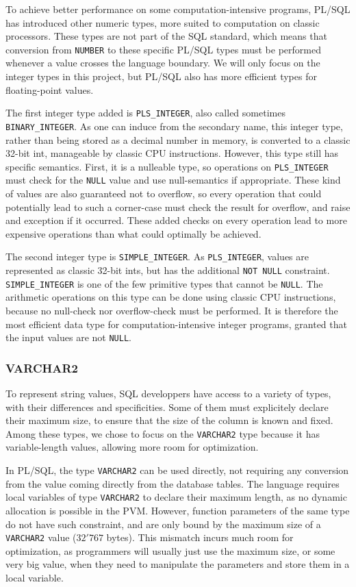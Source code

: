 \documentclass[twoside,11pt,a4paper]{article}
\newcommand{\pls}[1]{\texttt{#1}}
\newcommand{\plstype}[1]{\pls{#1}}
\newcommand{\varchar}{\plstype{VARCHAR2}}
\newcommand{\oranum}{\plstype{NUMBER}}
\newcommand{\plsi}{\plstype{PLS\_INTEGER}}
\newcommand{\simpleint}{\plstype{SIMPLE\_INTEGER}}
\newcommand{\plsnull}{\pls{NULL}}
\begin{document}
To achieve better performance on some computation-intensive programs, PL/SQL has introduced other numeric types, more suited to computation on classic processors. These types are not part of the SQL standard, which means that conversion from \oranum{} to these specific PL/SQL types must be performed whenever a value crosses the language boundary. We will only focus on the integer types in this project, but PL/SQL also has more efficient types for floating-point values.

The first integer type added is \plsi{}, also called sometimes \plstype{BINARY\_INTEGER}. As one can induce from the secondary name, this integer type, rather than being stored as a decimal number in memory, is converted to a classic 32-bit int, manageable by classic CPU instructions. However, this type still has specific semantics. First, it is a nulleable type, so operations on \plsi{} must check for the \plsnull{} value and use null-semantics if appropriate. These kind of values are also guaranteed not to overflow, so every operation that could potentially lead to such a corner-case must check the result for overflow, and raise and exception if it occurred. These added checks on every operation lead to more expensive operations than what could optimally be achieved.

The second integer type is \simpleint{}. As \plsi{}, values are represented as classic 32-bit ints, but has the additional \pls{NOT NULL} constraint. \simpleint{} is one of the few primitive types that cannot be \plsnull{}. The arithmetic operations on this type can be done using classic CPU instructions, because no null-check nor overflow-check must be performed. It is therefore the most efficient data type for computation-intensive integer programs, granted that the input values are not \plsnull{}.

\subsubsection{VARCHAR2}

To represent string values, SQL developpers have access to a variety of types, with their differences and specificities. Some of them must explicitely declare their maximum size, to ensure that the size of the column is known and fixed. Among these types, we chose to focus on the \varchar{} type because it has variable-length values, allowing more room for optimization.

In PL/SQL, the type \varchar{} can be used directly, not requiring any conversion from the value coming directly from the database tables. The language requires local variables of type \varchar{} to declare their maximum length, as no dynamic allocation is possible in the PVM. However, function parameters of the same type do not have such constraint, and are only bound by the maximum size of a \varchar{} value ($32'767$ bytes). This mismatch incurs much room for optimization, as programmers will usually just use the maximum size, or some very big value, when they need to manipulate the parameters and store them in a local variable.
\end{document}
